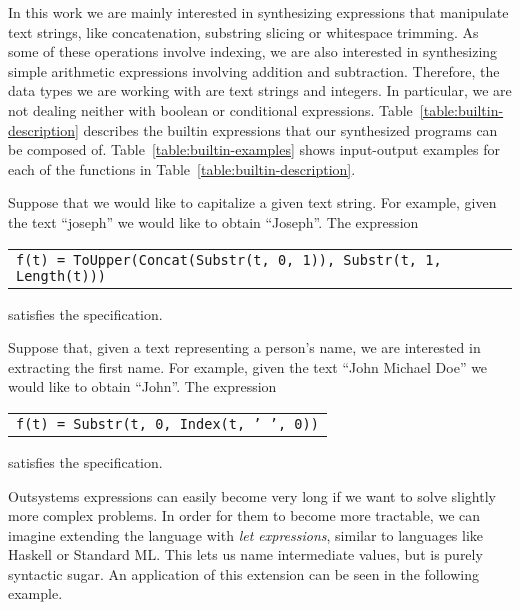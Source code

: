 In this work we are mainly interested in synthesizing expressions that
manipulate text strings, like concatenation, substring slicing or whitespace
trimming. As some of these operations involve indexing, we are also interested
in synthesizing simple arithmetic expressions involving addition and
subtraction. Therefore, the data types we are working with are text strings and
integers. In particular, we are not dealing neither with boolean or conditional
expressions. Table~\ref{table:builtin-description} describes the builtin
expressions that our synthesized programs can be composed of.
Table~\ref{table:builtin-examples} shows input-output examples for each of the
functions in Table~\ref{table:builtin-description}.

\begin{example}
  Suppose that we would like to capitalize a given text string. For example,
given the text ``joseph'' we would like to obtain ``Joseph''. The expression

\begin{center}
  \begin{tabular}{l}
    \texttt{f(t) = ToUpper(Concat(Substr(t, 0, 1)), Substr(t, 1, Length(t)))}\\
  \end{tabular}
\end{center}

\noindent
satisfies the specification.
\end{example}

\begin{example}
  Suppose that, given a text representing a person's name, we are interested in
extracting the first name. For example, given the text ``John Michael Doe'' we
would like to obtain ``John''. The expression
 
\begin{center}
  \begin{tabular}{l}
    \texttt{f(t) = Substr(t, 0, Index(t, ' ', 0))}\\
  \end{tabular}
\end{center}

\noindent
satisfies the specification.
\end{example}

Outsystems expressions can easily become very long if we want to solve slightly
more complex problems. In order for them to become more tractable, we can
imagine extending the language with \textit{let expressions}, similar to
languages like Haskell or Standard ML. This lets us name intermediate values,
but is purely syntactic sugar. An application of this extension can be seen in
the following example.

